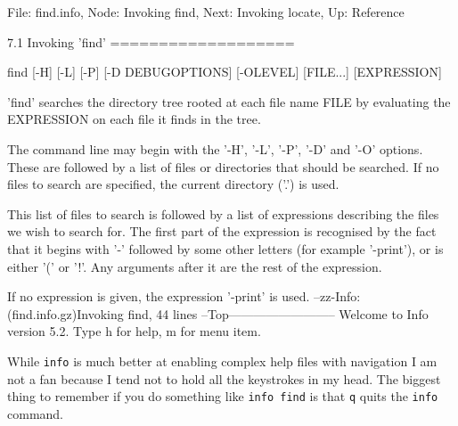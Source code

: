 \documentclass[10pt,american,]{book}
\newenvironment{Shaded}{\begin{snugshade}}{\end{snugshade}}
\newcommand{\KeywordTok}[1]{\textcolor[rgb]{0.13,0.29,0.53}{\textbf{{#1}}}}
\newcommand{\StringTok}[1]{\textcolor[rgb]{0.31,0.60,0.02}{{#1}}}
\newcommand{\NormalTok}[1]{{#1}}
\numberwithin{figure}{chapter}
\renewcommand{\KeywordTok}[1]{{#1}}
\renewcommand{\StringTok}[1]{{#1}}
\renewcommand{\NormalTok}[1]{{#1}}
\begin{document}
\begin{Shaded}
\begin{Highlighting}[]
\KeywordTok{File}\NormalTok{: find.info,  Node: Invoking find,  Next: Invoking locate,  Up: Reference}

\KeywordTok{7.1} \NormalTok{Invoking }\StringTok{'find'}
\NormalTok{===================}

     \KeywordTok{find} \NormalTok{[-H] [-L] [-P] [-D DEBUGOPTIONS] [-OLEVEL] [FILE...] [EXPRESSION]}

   \StringTok{'find'} \KeywordTok{searches} \NormalTok{the directory tree rooted at each file name FILE by}
\KeywordTok{evaluating} \NormalTok{the EXPRESSION on each file it finds in the tree.}

   \KeywordTok{The} \NormalTok{command line may begin with the }\StringTok{'-H'}\NormalTok{, }\StringTok{'-L'}\NormalTok{, }\StringTok{'-P'}\NormalTok{, }\StringTok{'-D'} \NormalTok{and }\StringTok{'-O'}
\KeywordTok{options.}  \NormalTok{These are followed by a list of files or directories that}
\KeywordTok{should} \NormalTok{be searched.  If no files to search are specified, the current}
\KeywordTok{directory} \NormalTok{(}\StringTok{'.'}\NormalTok{) }\KeywordTok{is} \NormalTok{used.}

   \KeywordTok{This} \NormalTok{list of files to search is followed by a list of expressions}
\KeywordTok{describing} \NormalTok{the files we wish to search for.  The first part of the}
\KeywordTok{expression} \NormalTok{is recognised by the fact that it begins with }\StringTok{'-'} \NormalTok{followed by}
\KeywordTok{some} \NormalTok{other letters (for example }\StringTok{'-print'}\NormalTok{), }\KeywordTok{or} \NormalTok{is either }\StringTok{'('} \NormalTok{or }\StringTok{'!'}\NormalTok{.  Any}
\KeywordTok{arguments} \NormalTok{after it are the rest of the expression.}

   \KeywordTok{If} \NormalTok{no expression is given, the expression }\StringTok{'-print'} \NormalTok{is used.}
\KeywordTok{--zz-Info}\NormalTok{: (find.info.gz)}\KeywordTok{Invoking} \NormalTok{find, 44 lines --Top--------------------------}
\KeywordTok{Welcome} \NormalTok{to Info version 5.2. Type h for help, m for menu item.}
\end{Highlighting}
\end{Shaded}

While \texttt{info} is much better at enabling complex help files with
navigation I am not a fan because I tend not to hold all the keystrokes
in my head. The biggest thing to remember if you do something like
\texttt{info\ find} is that \texttt{q} quits the \texttt{info} command.
\end{document}
